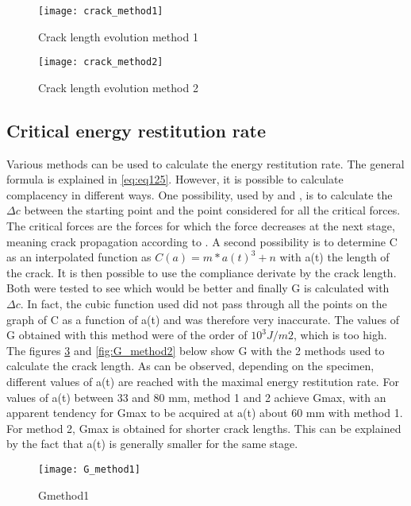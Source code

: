 \begin{figure}[htp]
	\centering
	\texttt{[image: crack\_method1]}
	\caption{Crack length evolution method 1}
	\label{fig:crack_method1}
\end{figure}

\begin{figure}[htp]
	\centering
	\texttt{[image: crack\_method2]}
	\caption{Crack length evolution method 2}
	\label{fig:crack_method2}
\end{figure}

\subsection{Critical energy restitution rate}

Various methods can be used to calculate the energy restitution rate. The general formula is explained in \ref{eq:eq125}. However, it is possible to calculate complacency in different ways. One possibility, used by \cite{MALFAIT2021} and \cite{MoutouPitti2008}, is to calculate the $\Delta c$ between the starting point and the point considered for all the critical forces. The critical forces are the forces for which the force decreases at the next stage, meaning crack propagation according to \cite{MoutouPitti2008}. A second possibility is to determine C as an interpolated function as $C(a)=m*a(t)^3+n$ with a(t) the length of the crack.  It is then possible to use the compliance derivate by the crack length. Both were tested to see which would be better and finally G is calculated with $\Delta c$. In fact, the cubic function used did not pass through all the points on the graph of C as a function of a(t) and was therefore very inaccurate. The values of G obtained with this method were of the order of $10^3 J/m2$, which is too high.
The figures \ref{fig:G_method1} and \ref{fig:G_method2} below show G with the 2 methods used to calculate the crack length.
As can be observed, depending on the specimen, different values of a(t) are reached with the maximal energy restitution rate. For values of a(t) between 33 and 80 mm, method 1 and 2 achieve Gmax, with an apparent tendency for Gmax to be acquired at a(t) about 60 mm with method 1. For method 2, Gmax is obtained for shorter crack lengths. This can be explained by the fact that a(t) is generally smaller for the same stage.

\begin{figure}[htp]
	\centering
	\texttt{[image: G\_method1]}
	\caption{Gmethod1}
	\label{fig:G_method1}
\end{figure}

